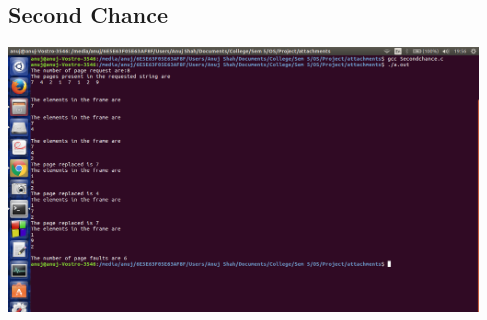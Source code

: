 \documentclass[12pt]{article}
\begin{document}
\begin{flushleft}
		\subsection{Second Chance}
		\includegraphics[height=7cm]{Secondchance_result.png}
	\end{flushleft}
	
\end{document}
